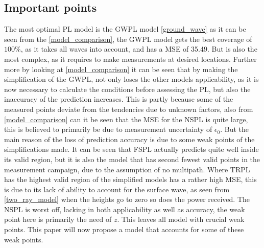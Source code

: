 \subsection*{Important points}
The most optimal PL model is the GWPL model \eqref{ground_wave} as it can be seen from the  \autoref{model_comparison}, the GWPL model gets the best coverage of $100\%$, as it takes all waves into account, and has a MSE of 35.49. But is also the most complex, as it requires to make measurements at desired locations. Further more by looking at \autoref{model_comparison} it can be seen that by making the simplification of the GWPL, not only loses the other models applicability, as it is now necessary to calculate the conditions before assessing the PL, but also the inaccuracy of the prediction increases. 
This is partly because some of the measured points deviate from the tendencies due to unknown factors, also from \autoref{model_comparison} can it be seen that the MSE for the NSPL is quite large, this is believed to primarily be due to measurement uncertainty of $\epsilon_{0}$.  
But the main reason of the loss of prediction accuracy is due to some weak points of the simplifications made. It can be seen that FSPL actually predicts quite well inside its valid region, but it is also the model that has second fewest valid points in the measurement campaign, due to the assumption of no multipath. Where TRPL has the highest valid region of the simplified models has a rather high MSE, this is due to its lack of ability to account for the surface wave, as seen from \eqref{two_ray_model} when the heights go to zero so does the power received. The NSPL is worst off, lacking in both applicability as well as accuracy, the weak point here is primarily the need of $z$. This leaves all model with crucial weak points. This paper will now propose a model that accounts for some of these weak points. 





